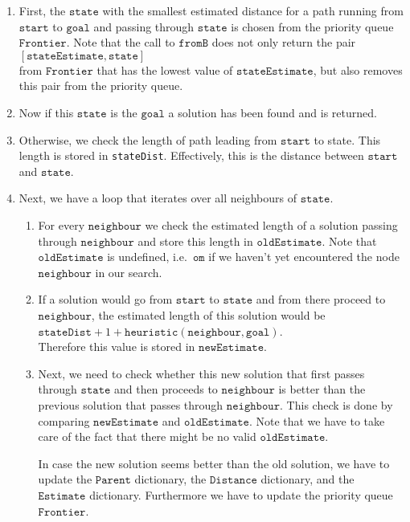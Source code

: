 \begin{enumerate}
\item First, the $\mathtt{state}$ with the smallest estimated distance for a path running from $\mathtt{start}$
      to $\mathtt{goal}$ and passing through $\mathtt{state}$ is chosen from the priority queue
      $\mathtt{Frontier}$.  Note that the call to $\mathtt{fromB}$ does not only return the pair
      \\[0.2cm]
      \hspace*{1.3cm}
      $[\mathtt{stateEstimate}, \mathtt{state}]$
      \\[0.2cm]
      from $\mathtt{Frontier}$ that has the lowest value of $\mathtt{stateEstimate}$, but also removes this
      pair from the priority queue.
\item Now if this $\mathtt{state}$ is the $\mathtt{goal}$ a solution has been found and is returned.
\item Otherwise, we check the length of path leading from $\mathtt{start}$ to state.  This length is stored in 
      \texttt{stateDist}.  Effectively, this is the distance between $\mathtt{start}$ and $\mathtt{state}$.
\item Next, we have a loop that iterates over all neighbours of $\mathtt{state}$.
      \begin{enumerate}
      \item For every $\mathtt{neighbour}$ we check the estimated length of a solution passing through
            $\mathtt{neighbour}$ and store this length in $\mathtt{oldEstimate}$.   Note that
            $\mathtt{oldEstimate}$ is undefined, i.e.~$\mathtt{om}$ if we haven't yet encountered the node
            $\mathtt{neighbour}$ in our search.
      \item If a solution would go from $\mathtt{start}$ to $\mathtt{state}$ and from there proceed to
            $\mathtt{neighbour}$, the estimated length of this solution would be
            \\[0.2cm]
            \hspace*{1.3cm}
            $\mathtt{stateDist} + 1 + \mathtt{heuristic}(\mathtt{neighbour}, \mathtt{goal})$.
            \\[0.2cm]
            Therefore this value is stored in $\mathtt{newEstimate}$.  
      \item Next, we need to check whether this new solution that first passes through $\mathtt{state}$ and
            then proceeds to $\mathtt{neighbour}$ is better than the previous solution that passes through
            $\mathtt{neighbour}$.  This check is done by comparing $\mathtt{newEstimate}$ and
            $\mathtt{oldEstimate}$.  Note that we have to take care of the fact that there might be no valid
            $\mathtt{oldEstimate}$.

            In case the new solution seems better than the old solution, we have to update
            the $\mathtt{Parent}$ dictionary, the $\mathtt{Distance}$ dictionary, and the $\mathtt{Estimate}$
            dictionary.  Furthermore we have to update the priority queue $\mathtt{Frontier}$.
      \end{enumerate}
\end{enumerate}
